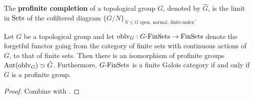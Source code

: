                 \begin{definition} \label{def: profinite_completions_of_groups}
                    The \textbf{profinite completion} of a topological group $G$, denoted by $\hat{G}$, is the limit in $\mathrm{Sets}$ of the cofiltered diagram $\{G/N\}_{\text{$N \leq G$ open, normal, finite-index}}$. 
                \end{definition}
                \begin{proposition} \label{prop: finite_galois_categories_of_equivariant_finite_sets}
                    Let $G$ be a topological group and let $\mathrm{oblv}_G: G\text{-}\mathrm{Fin}\mathrm{Sets} \to \mathrm{Fin}\mathrm{Sets}$ denote the forgetful functor going from the category of finite sets with continuous actions of $G$, to that of finite sets. Then there is an isomorphism of profinite groups $\mathrm{Aut}(\mathrm{oblv}_G) \simeq \hat{G}$. Furthermore, $G\text{-}\mathrm{Fin}\mathrm{Sets}$ is a finite Galois category if and only if $G$ is a profinite group. 
                \end{proposition}
                    \begin{proof}
                        Combine \cite[IV.2.4 et IV.2.7]{sga4} with \cite[\href{https://stacks.math.columbia.edu/tag/0BMU}{Tag 0BMU}]{stacks}.
                    \end{proof}
                    
